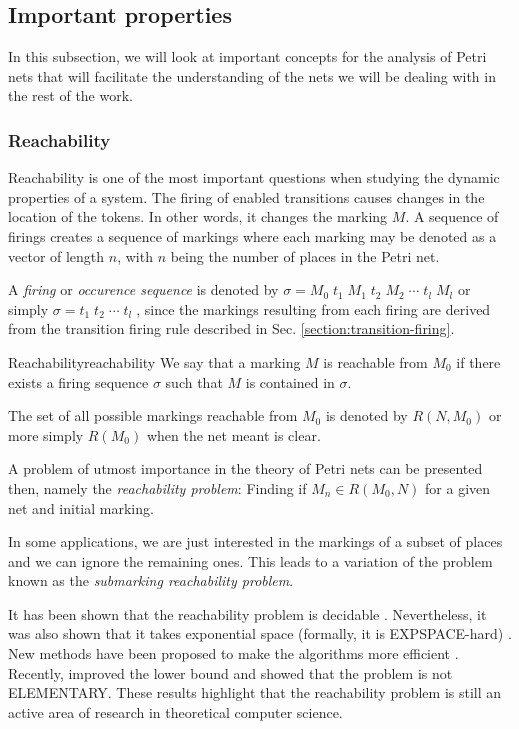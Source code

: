 \subsection{Important properties}

In this subsection, we will look at important concepts for the analysis of Petri nets
that will facilitate the understanding of the nets we will be dealing with in the rest of the work.

\subsubsection{Reachability}

Reachability is one of the most important questions when studying the dynamic properties of a system.
The firing of enabled transitions causes changes in the location of the tokens.
In other words, it changes the marking $M$.
A sequence of firings creates a sequence of markings
where each marking may be denoted as a vector of length $n$,
with $n$ being the number of places in the Petri net.

A \textit{firing} or \textit{occurence sequence} is denoted by
$ \sigma = M_0\; t_1\; M_1\; t_2\; M_2\; \cdots\; t_l\; M_l$ or simply
$ \sigma = t_1\; t_2\; \cdots\; t_l\; $, since the markings
resulting from each firing are derived
from the transition firing rule described in Sec. \ref{section:transition-firing}.

\begin{definition}{Reachability}{reachability}
    We say that a marking $M$ is reachable from $M_0$
    if there exists a firing sequence $\sigma$ such that $M$ is contained in $\sigma$.
\end{definition}

The set of all possible markings reachable from $M_0$ is denoted by $R(N, M_0)$ or more simply
$R(M_0)$ when the net meant is clear.

A problem of utmost importance in the theory of Petri nets can be presented then,
namely the \textit{reachability problem}:
Finding if $M_n \in R(M_0, N)$ for a given net and initial marking.

In some applications, we are just interested in the markings of a subset of places
and we can ignore the remaining ones.
This leads to a variation of the problem known as the \textit{submarking reachability problem}.

It has been shown that the reachability problem is decidable \cite{mayr1981}.
Nevertheless, it was also shown that it takes exponential space (formally, it is EXPSPACE-hard) \cite{lipton1976}.
New methods have been proposed to make the algorithms more efficient \cite{kungas2005petri}.
Recently, \cite{czerwinski2020reachability} improved the lower bound and showed that the problem is not ELEMENTARY.
These results highlight that the reachability problem is still
an active area of research in theoretical computer science.

